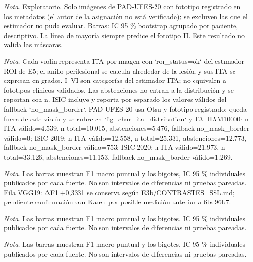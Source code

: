 \caption{Exactitud exacta del estimador ITA frente al fototipo Fitzpatrick registrado en PAD-UFES-20, con la línea base de predecir siempre el fototipo mayoritario.}
\textit{Nota.} Exploratorio. Solo imágenes de PAD-UFES-20 con fototipo registrado en los metadatos (el autor de la asignación no está verificado); se excluyen las que el estimador no pudo evaluar. Barras: IC 95 \% bootstrap agrupado por paciente, descriptivo. La línea de mayoría siempre predice el fototipo II. Este resultado no valida las máscaras.

\caption{Distribución continua de ITA por imagen para HAM10000, ISIC 2019 e ISIC 2020, con el ROI perilesional de E5.}
\textit{Nota.} Cada violín representa ITA por imagen con `roi\_status=ok` del estimador ROI de E5; el anillo perilesional se calcula alrededor de la lesión y sus ITA se expresan en grados. I–VI son categorías del estimador ITA; no equivalen a fototipos clínicos validados. Las abstenciones no entran a la distribución y se reportan con n. ISIC incluye y reporta por separado los valores válidos del fallback `no\_mask\_border`. PAD-UFES-20 usa Otsu y fototipo registrado; queda fuera de este violín y se cubre en `fig\_char\_ita\_distribution` y T3. HAM10000: n ITA válido=4.539, n total=10.015, abstenciones=5.476, fallback no\_mask\_border válido=0; ISIC 2019: n ITA válido=12.558, n total=25.331, abstenciones=12.773, fallback no\_mask\_border válido=753; ISIC 2020: n ITA válido=21.973, n total=33.126, abstenciones=11.153, fallback no\_mask\_border válido=1.269.

\caption{F1 macro de B71 con TTA canónico frente a ocho baselines congelados re-evaluados en el mismo split v6/v7 (2.004 imágenes).}
\textit{Nota.} Las barras muestran F1 macro puntual y los bigotes, IC 95 \% individuales publicados por cada fuente. No son intervalos de diferencias ni pruebas pareadas. Fila VGG19: ΔF1 +0,3331 se conserva según E3b/CONTRASTES\_SSL.md; pendiente confirmación con Karen por posible medición anterior a 6bd96b7.

\caption{F1 macro del E1 canónico (batch 64 + autocast; n=5.067): B71 original transductivo y ocho baselines congelados con probe logreg; validación StratifiedKFold sin patient\_id.}
\textit{Nota.} Las barras muestran F1 macro puntual y los bigotes, IC 95 \% individuales publicados por cada fuente. No son intervalos de diferencias ni pruebas pareadas.

\caption{F1 macro del E1 canónico (batch 64 + autocast; n=6.660): B71 original transductivo y ocho baselines congelados con probe logreg; validación agrupada por patient\_id.}
\textit{Nota.} Las barras muestran F1 macro puntual y los bigotes, IC 95 \% individuales publicados por cada fuente. No son intervalos de diferencias ni pruebas pareadas.

